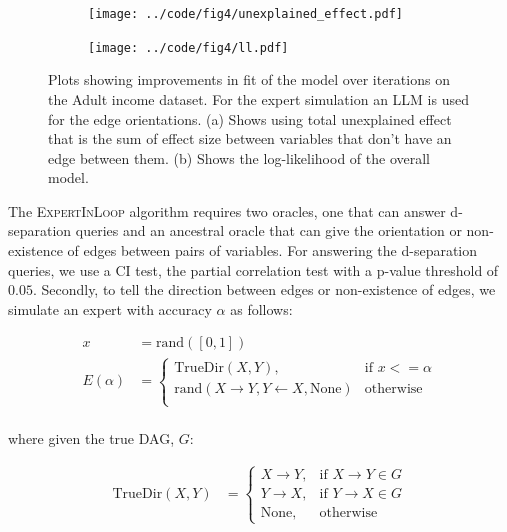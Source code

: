 \documentclass{uai2025} %
\begin{document}
\begin{figure}[t!]
	\begin{subfigure}{0.25\textwidth}
		\centering
		\texttt{[image: ../code/fig4/unexplained\_effect.pdf]}
		\caption{}
	\end{subfigure}%
	\begin{subfigure}{0.25\textwidth}
		\centering
		\texttt{[image: ../code/fig4/ll.pdf]}
		\caption{}
	\end{subfigure}
	\caption{Plots showing improvements in fit of the model over iterations
	on the Adult income dataset. For the expert simulation an LLM is used
	for the edge orientations. (a) Shows using total unexplained effect that is the
	sum of effect size between variables that don't have an edge between them. (b)
	Shows the log-likelihood of the overall model.
	}
	\label{fig:unexplained_ll}
\end{figure}

The \textsc{ExpertInLoop} algorithm requires two oracles, one that can answer
d-separation queries and an ancestral oracle that can give the orientation or
non-existence of edges between pairs of variables. For answering the
d-separation queries, we use a CI test, the partial correlation test with a
p-value threshold of $ 0.05 $. Secondly, to tell the direction between edges or
non-existence of edges, we simulate an expert with accuracy $ \alpha $ as
follows:

\begin{equation}
	\begin{split}
		x &= \textrm{rand}([0, 1]) \\
		E(\alpha) &= \begin{cases} 
			\mathrm{TrueDir}(X, Y),  & \textrm{if  } x <= \alpha \\
			\textrm{rand}(X \rightarrow Y, Y \leftarrow X, \textrm{None}) & \textrm{otherwise} \\
				\end{cases} \\
	\end{split}
\end{equation}

where given the true DAG, $ G $:

\begin{equation}
	\begin{split}
	\mathrm{TrueDir}(X, Y) &= \begin{cases}
					X \rightarrow Y, & \textrm{if } X \rightarrow Y \in G \\
					Y \rightarrow X, & \textrm{if } Y \rightarrow X \in G \\
					\textrm{None}, & \textrm{otherwise }
				  \end{cases}
	\end{split}
\end{equation}
\end{document}
